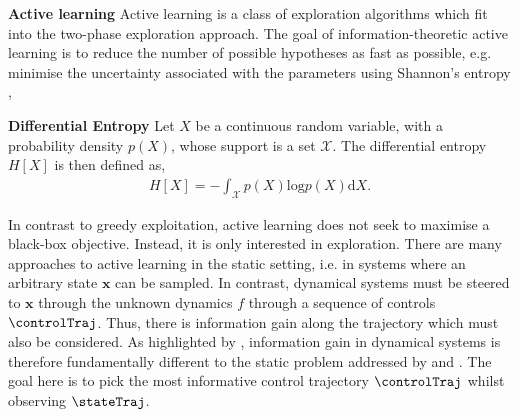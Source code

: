 \documentclass{mimosis-class/mimosis}
\numberwithin{equation}{chapter}
\newcommand{\state}{\ensuremath{\mathbf{x}}}
\begin{document}
\textbf{Active learning}
Active learning is a class of exploration algorithms which fit into the two-phase exploration approach.
The goal of information-theoretic active learning is to reduce the number of
possible hypotheses as fast as possible, e.g. minimise the uncertainty associated
with the parameters using Shannon's entropy \citep{coverElements2006},
\newcommand{\crv}{\ensuremath{X}}
\newcommand{\density}{\ensuremath{p(\crv)}}
\begin{myquote}
\textbf{Differential Entropy}
Let $\crv$ be a continuous random variable, with a probability density
$\density$,
whose support is a set $\mathcal{X}$.
The differential entropy $H[\crv]$ is then defined as,
\begin{align} \label{eq-differential-entropy}
H[\crv] = - \int_{\mathcal{X}} \density \text{log} \density \text{d} \crv.
\end{align}
\end{myquote}
In contrast to greedy exploitation, active learning does not seek to maximise a
black-box objective. Instead, it is only interested in exploration. There are many
approaches to active learning in the static setting, i.e. in systems where an arbitrary
state \(\state\) can be sampled. In contrast, dynamical systems must be steered to \(\state\)
through the unknown dynamics \(f\) through a sequence of controls \(\controlTraj\). Thus, there is
information gain along the trajectory which must also be considered. As highlighted
by \cite{buisson-fenetActively2020}, information gain in dynamical systems is therefore
fundamentally different to the static problem addressed by \cite{krauseNearOptimal2008}  and
\cite{houlsbyBayesian2011}.
The goal here is to pick the most informative control trajectory
\(\controlTraj\) whilst observing \(\stateTraj\).
\end{document}
